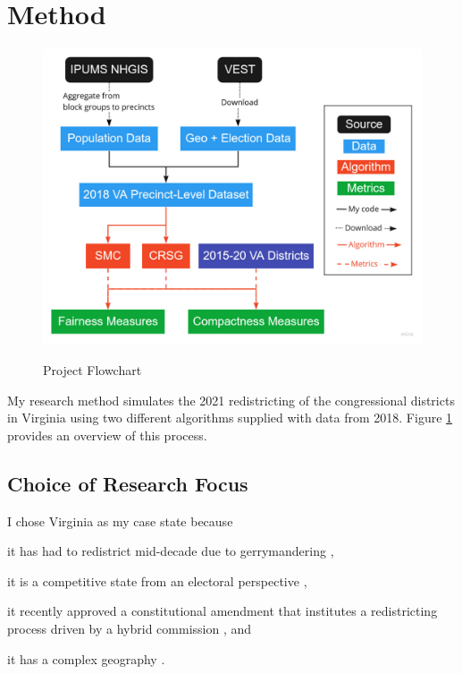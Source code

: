 \section{Method}
\label{sec:method}

\begin{figure}[H]
    \caption{Project Flowchart}
    \includegraphics[width=0.85\linewidth]{img/flowchart.pdf}
    \label{fig:flowchart}
    \raggedright
\end{figure}  

My research method simulates the 2021 redistricting of the congressional districts in Virginia using two different algorithms supplied with data from 2018. Figure \ref{fig:flowchart} provides an overview of this process.

\subsection{Choice of Research Focus}

I chose Virginia as my case state because 
\begin{seriate}
    \item it has had to redistrict mid-decade due to gerrymandering \parencite[see][]{wittmanvpersonhuballah2016},
    \item it is a competitive state from an electoral perspective \parencite{virginiadeparmentofelections2021}, 
    \item it recently approved a constitutional amendment that institutes a redistricting process driven by a hybrid commission \parencite{ballotpedia2020}, and
    \item it has a complex geography \parencite{unitedstatesgeologicalsurvey2021}.
\end{seriate}

